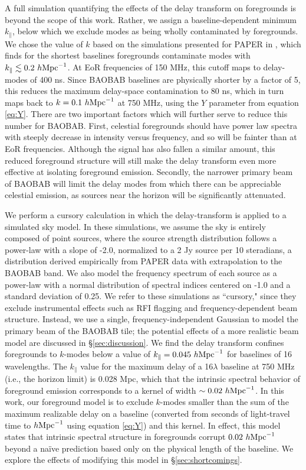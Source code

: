 \documentclass[10pt,iop]{emulateapj}
\begin{document}
A full simulation quantifying the effects of the delay transform on foregrounds
is beyond the scope of this work.  Rather, we assign a baseline-dependent minimum 
$k_{\parallel}$, below which we exclude modes as being wholly contaminated by foregrounds.
We chose the value of $k$ based on the simulations presented for PAPER
in \citet{parsons_et_al_2012b}, which finds for the shortest baselines
foregrounds contaminate modes with $k_{\parallel} \lesssim 0.2~h\rm{Mpc}^{-1}$.  
At EoR frequencies of 150 MHz, this cutoff maps to delay-modes of 400 ns.  Since BAOBAB
baselines are physically shorter by a factor of 5, this reduces the maximum
delay-space contamination to 80 ns, which in turn maps back to $k = 0.1~h\rm{Mpc}^{-1}$
at 750 MHz, using the $Y$ parameter from equation \ref{eq:Y}.
There are two important factors which will further serve to reduce this number
for BAOBAB.  First, celestial foregrounds should have power law spectra with steeply decrease
in intensity versus frequency, and so will be fainter than at EoR frequencies. 
Although the signal has also fallen a similar amount, this reduced foreground structure will still make the delay transform even more
effective at isolating foreground emission.  Secondly, the narrower primary beam of BAOBAB
will limit the delay modes from which there can be appreciable celestial emission,
as sources near the horizon will be significantly attenuated.  

We perform a cursory calculation in which the delay-transform is applied to a simulated sky model.  
In these simulations, we assume the sky is entirely composed of point sources, where the source
strength distribution follows a power-law with a slope of -2.0, normalized
to a 2 Jy source per 10 steradians, a distribution derived empirically
from PAPER data with extrapolation to the BAOBAB band.  
We also model the frequency spectrum of each
source as a power-law with a normal distribution of spectral indices centered on -1.0
and a standard deviation of 0.25.  We refer to these
simulations as ``cursory," since they exclude instrumental effects such as RFI flagging
and frequency-dependent beam structure.  
Instead, we use a single, frequency-independent Gaussian to model the primary beam of the
BAOBAB tile; the potential effects of a more realistic beam model are discussed in \S\ref{sec:discussion}.
We find the delay transform confines foregrounds to $k$-modes below a value of 
$k_{\parallel} = 0.045~h{\rm Mpc}^{-1}$ for baselines of 16 wavelengths.
The $k_{\parallel}$ value for the maximum delay of a 16$\lambda$ baseline at 750 MHz (i.e., the 
horizon limit) is 0.028 Mpc, which that the intrinsic spectral behavior of foreground emission
corresponds to a kernel of width $\sim 0.02~h{\rm Mpc}^{-1}$.  In this work, our foreground model
is to exclude $k$-modes smaller than the sum of the maximum realizable delay on a baseline
(converted from seconds of light-travel time to $h{\rm Mpc}^{-1}$ using equation \ref{eq:Y}) 
and this kernel.  In effect, this model states that intrinsic spectral structure in foregrounds 
corrupt $0.02~h{\rm Mpc}^{-1}$ beyond a na\"{i}ve prediction based only on the physical 
length of the baseline.  We explore the effects of modifying this model in \S\ref{sec:shortcomings}.
\end{document}
